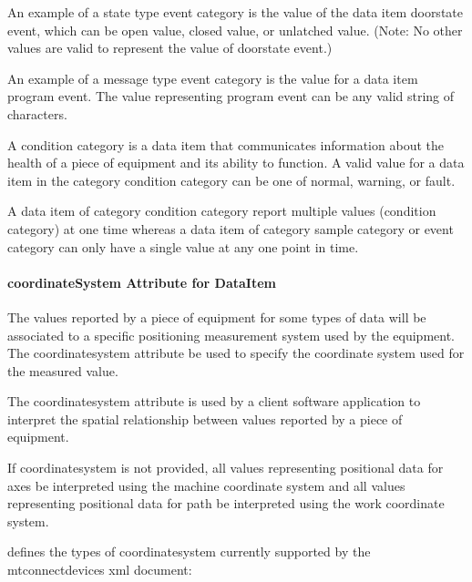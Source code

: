 An example of a state type \gls{event category} is the value of the data item \gls{doorstate event}, which can be \gls{open value}, \gls{closed value}, or \gls{unlatched value}.   (Note:  No other values are valid to represent the value of \gls{doorstate event}.)

An example of a message type \gls{event category} is the value for a data item \gls{program event}.  The value representing \gls{program event} can be any valid string of characters.



A \gls{condition category} is a data item that communicates information about the health of a piece of equipment and its ability to function.  A valid value for a data item in the category \gls{condition category} can be one of \gls{normal}, \gls{warning}, or \gls{fault}.

A data item of category \gls{condition category} \may report multiple values (\gls{condition category}) at one time whereas a data item of category \gls{sample category} or \gls{event category} can only have a single value at any one point in time.

\newpage

\paragraph{coordinateSystem Attribute for DataItem}\mbox{}

The values reported by a piece of equipment for some types of data will be associated to a specific positioning measurement system used by the equipment.  The \gls{coordinatesystem} attribute \may be used to specify the coordinate system used for the measured value.

The \gls{coordinatesystem} attribute is used by a client software application to interpret the spatial relationship between values reported by a piece of equipment.

If \gls{coordinatesystem} is not provided, all values representing positional data for \gls{axes} \must be interpreted using the \gls{machine} coordinate system and all values representing positional data for \gls{path} \must be interpreted using the \gls{work} coordinate system.

 defines the types of \gls{coordinatesystem} currently supported by the \gls{mtconnectdevices} \gls{xml} document:




